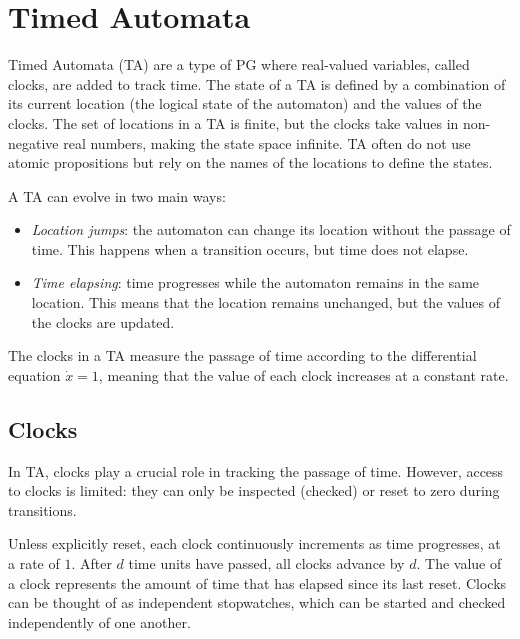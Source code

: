 \section{Timed Automata}

Timed Automata (TA) are a type of PG where real-valued variables, called clocks, are added to track time. 
The state of a TA is defined by a combination of its current location (the logical state of the automaton) and the values of the clocks.
The set of locations in a TA is finite, but the clocks take values in non-negative real numbers, making the state space infinite.
TA often do not use atomic propositions but rely on the names of the locations to define the states.

A TA can evolve in two main ways:
\begin{itemize}
    \item \textit{Location jumps}: the automaton can change its location without the passage of time. 
        This happens when a transition occurs, but time does not elapse.
    \item \textit{Time elapsing}: time progresses while the automaton remains in the same location. 
        This means that the location remains unchanged, but the values of the clocks are updated.
\end{itemize}

The clocks in a TA measure the passage of time according to the differential equation $\dot{x}=1$, meaning that the value of each clock increases at a constant rate.

\subsection{Clocks}
In TA, clocks play a crucial role in tracking the passage of time. 
However, access to clocks is limited: they can only be inspected (checked) or reset to zero during transitions.

Unless explicitly reset, each clock continuously increments as time progresses, at a rate of $1$. 
After $d$ time units have passed, all clocks advance by $d$.
The value of a clock represents the amount of time that has elapsed since its last reset. Clocks can be thought of as independent stopwatches, which can be started and checked independently of one another.

